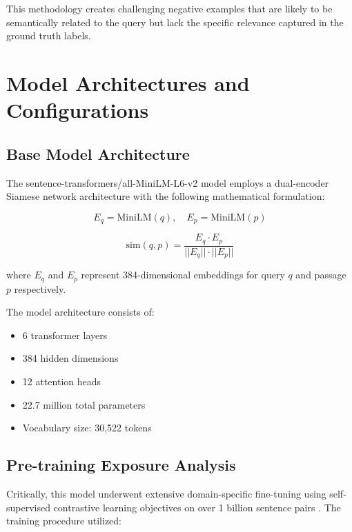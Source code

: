 This methodology creates challenging negative examples that are likely to be semantically related to the query but lack the specific relevance captured in the ground truth labels.

\section{Model Architectures and Configurations}

\subsection{Base Model Architecture}

The sentence-transformers/all-MiniLM-L6-v2 model employs a dual-encoder Siamese network architecture \cite{dong2022exploring, bromley1993signature} with the following mathematical formulation:

\begin{equation}
E_q = \text{MiniLM}(q), \quad E_p = \text{MiniLM}(p)
\end{equation}

\begin{equation}
\text{sim}(q,p) = \frac{E_q \cdot E_p}{||E_q|| \cdot ||E_p||}
\end{equation}

where $E_q$ and $E_p$ represent 384-dimensional embeddings for query $q$ and passage $p$ respectively.

The model architecture consists of:
\begin{itemize}
\item 6 transformer layers \cite{vaswani2017attention}
\item 384 hidden dimensions  
\item 12 attention heads
\item 22.7 million total parameters
\item Vocabulary size: 30,522 tokens
\end{itemize}

\subsection{Pre-training Exposure Analysis}

Critically, this model underwent extensive domain-specific fine-tuning using self-supervised contrastive learning objectives \cite{gao2021simcse} on over 1 billion sentence pairs \cite{huggingface_minilm}. The training procedure utilized:


